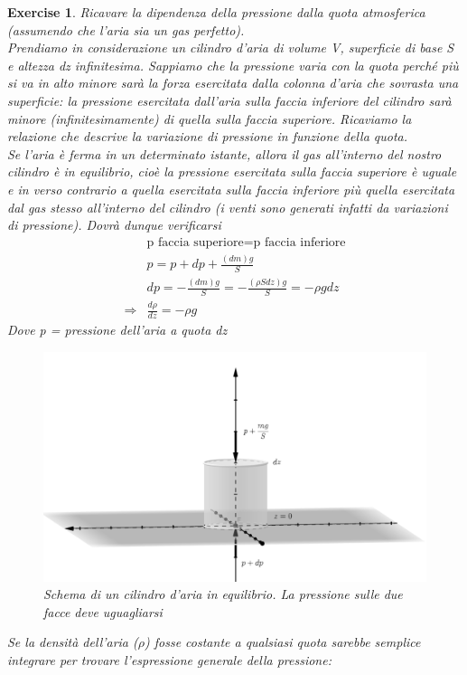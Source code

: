\documentclass[10pt,a4paper]{article}
\newtheorem{exercise}{Exercise}
\begin{document}
\begin{exercise}\label{ex:pressione_quota}
Ricavare la dipendenza della pressione dalla quota atmosferica (assumendo che l’aria sia un gas perfetto).\\
Prendiamo in considerazione un cilindro d'aria di volume V, superficie di base S e altezza dz infinitesima. Sappiamo che la pressione varia con la quota perché più si va in alto minore sarà la forza esercitata dalla colonna d'aria che sovrasta una superficie: la pressione esercitata dall'aria sulla faccia inferiore del cilindro sarà minore (infinitesimamente) di quella sulla faccia superiore. Ricaviamo la relazione che descrive la variazione di pressione in funzione della quota.\\
Se l'aria è ferma in un determinato istante, allora il gas all'interno del nostro cilindro è in equilibrio, cioè la pressione esercitata sulla faccia superiore è uguale e in verso contrario a quella esercitata sulla faccia inferiore più quella esercitata dal gas stesso all'interno del cilindro (i venti sono generati infatti da variazioni di pressione). Dovrà dunque verificarsi
\begin{align}\label{eq:stevin}
	&\text{p faccia superiore} = \text{p faccia inferiore}\nonumber\\
	&p  = p + dp \nonumber + \frac{(dm) g}{S}\nonumber\\
	&dp = -\frac{(dm)g}{S} = -\frac{(\rho S dz) g}{S}= -\rho g dz \nonumber \\
	\Rightarrow & \frac{d\rho}{dz}= - \rho g
\end{align} 
Dove p = pressione dell'aria a quota dz
\begin{figure}[h!]
	\centering
	\includegraphics[width=0.5\linewidth]{../images/cilindro_aria}
	\caption{Schema di un cilindro d'aria in equilibrio. La pressione sulle due facce deve uguagliarsi}
	\label{fig:cilindroaria}
\end{figure}
\FloatBarrier
Se la densità dell'aria ($\rho$) fosse costante a qualsiasi quota sarebbe semplice integrare per trovare l'espressione generale della pressione:
\begin{align*} 

\end{align*}
\end{exercise}
\end{document}
